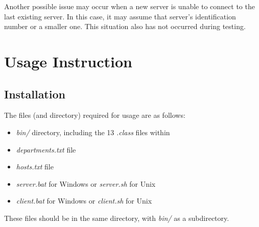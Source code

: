 \documentclass[a4paper,11pt]{article}
\begin{document}
Another possible issue may occur when a new server is unable to connect to the last existing server. In this case, it may assume that server's identification number or a smaller one. This situation also has not occurred during testing.

\section{Usage Instruction}
\subsection{Installation}
The files (and directory) required for usage are as follows:

\begin{itemize}
\item \emph{bin/} directory, including the 13 \emph{.class} files within
\item \emph{departments.txt} file
\item \emph{hosts.txt} file
\item \emph{server.bat} for Windows or \emph{server.sh} for Unix
\item \emph{client.bat} for Windows or \emph{client.sh} for Unix
\end{itemize}

\noindent
These files should be in the same directory, with \emph{bin/} as a subdirectory.
\end{document}
